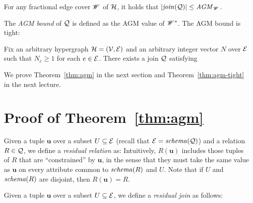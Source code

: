 \begin{theorem} \label{thm:agm}
   For any fractional edge cover $\mathscr{W}$ of $\mathcal{H}$, it holds that $|\mathit{join}(\mathcal{Q})| \le \mathit{AGM}_{\mathscr{W}}$.
\end{theorem}

\vgap

The {\em AGM bound} of $\mathcal{Q}$ is defined as the AGM value of $\mathscr{W}^*$.
The AGM bound is tight:

\vgap

\begin{theorem} \label{thm:agm-tight}
   Fix an arbitrary hypergraph $\mathcal{H} = (\mathcal{V}, \mathcal{E})$ and an arbitrary integer vector $N$ over $\mathcal{E}$ such that $N_e \ge 1$ for each $e \in \mathcal{E}$. There exists a join $\mathcal{Q}$ satisfying
\end{theorem}

\vgap

We prove Theorem~\ref{thm:agm} in the next section and Theorem~\ref{thm:agm-tight} in the next lecture.

\section{Proof of Theorem~\ref{thm:agm}} \label{sec:agm-proof}

Given a tuple $\bm{u}$ over a subset $U \subseteq \mathcal{E}$ (recall that $\mathcal{E} = \mathit{schema}(\mathcal{Q})$) and a relation $R \in \mathcal{Q}$, we define a {\em residual relation} as:
Intuitively, $R(\bm{u})$ includes those tuples of $R$ that are ``constrained'' by $\bm{u}$, in the sense that they must take the same value as $\bm{u}$ on every attribute common to $\mathit{schema}(R)$ and $U$. Note that if $U$ and $\mathit{schema}(R)$ are disjoint, then $R(\bm{u}) = R$.

\vgap

Given a tuple $\bm{u}$ over a subset $U \subseteq \mathcal{E}$, we define a {\em residual join} as follows:

